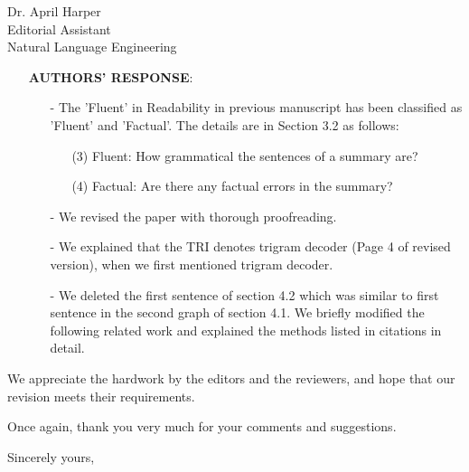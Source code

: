 \documentclass[11pt]{letter} %
\theoremstyle{definition}
\begin{document}
\begin{letter}{Dr. April Harper \\
            Editorial Assistant \\
			Natural Language Engineering}
\begin{enumerate}
\begin{itemize}
\begin{itemize}
                \item[-] The first sentence in the second paragraph of section 4.1 and the first sentence of section 4.2 are basically the same. Additionally, the list of those citations included in the duplicate sentence would be better elaborated by providing some additional details for those recent methods as well.
                \end{itemize}
				\item[] \textbf{AUTHORS' RESPONSE}:  
				\begin{itemize}
                \item[-] The 'Fluent' in Readability in previous manuscript has been classified as 'Fluent' and 'Factual'. The details are in Section 3.2 as follows:
                \begin{itemize}
                \item[] (3) Fluent: How grammatical the sentences of a summary are? 
                \item[] (4) Factual: Are there any factual errors in the summary?
                \end{itemize}
                \item[-] We revised the paper with thorough proofreading.
                \item[-] We explained that the TRI denotes trigram decoder
                (Page 4 of revised version), when we first mentioned trigram decoder.
                \item[-] We deleted the first sentence of section 4.2 which was similar to first sentence in the second graph of section 4.1. We briefly modified the following related work and explained the methods listed in citations in detail.
                \end{itemize}


			\end{itemize}
		\end{enumerate}
                
	
	
		We appreciate the hardwork by the editors and the reviewers,
		and hope that our revision meets their requirements.
		
		Once again, thank you very much for  your comments and suggestions.
		
		
		\closing{Sincerely yours,}
		
		
		
		
	\end{letter}
	
\end{document}
